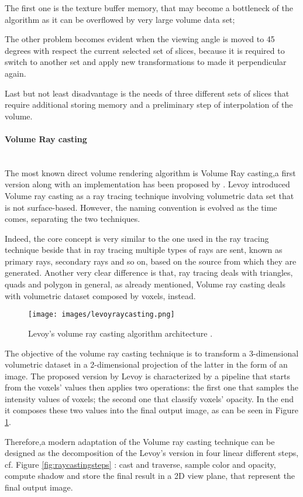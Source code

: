 \documentclass[12pt,a4paper]{extarticle}
\newcommand{\linespace}{\vspace{0pt}}
\newcommand{\myparagraph}[1]{\paragraph{#1}\mbox{}\\}
\begin{document}
The first one is the texture buffer memory, that may become a bottleneck of the algorithm as it can be overflowed by very large volume data set; 

The other problem becomes evident when the viewing angle is moved to 45 degrees with respect the current selected set of slices, because it is required to switch to another set and apply new transformations to made it perpendicular again.


Last but not least disadvantage is the needs of three different sets of slices that require additional storing memory and a preliminary step of interpolation of the volume.

\myparagraph{Volume Ray casting}
The most known direct volume rendering algorithm is Volume Ray casting,a first version along with an implementation has been proposed by \cite{levoy_1990:5}.
Levoy introduced Volume ray casting as a ray tracing technique involving volumetric data set that is not surface-based. However, the naming convention is evolved as the time comes, separating the two techniques.
\linespace

Indeed, the core concept is very similar to the one used in the ray tracing technique beside that in ray tracing multiple types of rays are sent, known as primary rays, secondary rays and so on, based on the source from which they are generated. Another very clear difference is that, ray tracing deals with triangles, quads and polygon in general, as already mentioned, Volume ray casting deals with volumetric dataset composed by voxels, instead.


\begin{figure}[hbtp]
\centering
\texttt{[image: images/levoyraycasting.png]}
\caption{Levoy's volume ray casting algorithm architecture \cite{levoy_1988:4}.}
\label{fig:levoyraycasting}
\end{figure}

The objective of the volume ray casting technique is to transform a 3-dimensional volumetric dataset in a 2-dimensional projection of the latter in the form of an image. The proposed version by Levoy is characterized by a pipeline that starts from the voxels' values then applies two operations: the first one that samples the intensity values of voxels; the second one that classify voxels' opacity. In the end it composes these two values into the final output image, as can be seen in Figure \ref{fig:levoyraycasting}.
\linespace

Therefore,a modern adaptation of the Volume ray casting technique can be designed as the decomposition of the Levoy's version in four linear different steps, cf. Figure \ref{fig:raycastingsteps} %
: cast and traverse, sample color and opacity, compute shadow and store the final result in a 2D view plane, that represent the final output image.
\end{document}

